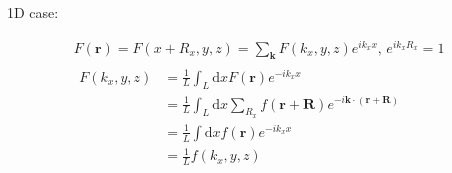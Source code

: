\noindent
1D case:

\begin{equation}\label{sum-function-fourier-1D}
    \begin{gathered}
        F(\mathbf{r}) = F(x+R_x,y,z) 
        = \sum_{\mathbf{k}} F(k_x, y, z) e^{ik_x x} , \, 
            e^{ik_xR_x} = 1 \\
        \begin{aligned}
            F(k_x, y, z) 
            &= \frac{1}{L} \int_{L} \mathrm{d}x F(\mathbf{r}) e^{-ik_xx} \\
            &= \frac{1}{L} \int_{L} \mathrm{d}x \sum_{R_x} f(\mathbf{r}+\mathbf{R}) e^{-i\mathbf{k}\cdot(\mathbf{r}+\mathbf{R})} \\
            &= \frac{1}{L} \int \mathrm{d}x f(\mathbf{r}) e^{-ik_xx} \\
            &= \frac{1}{L} f(k_x, y, z)
        \end{aligned}
    \end{gathered}
\end{equation}
